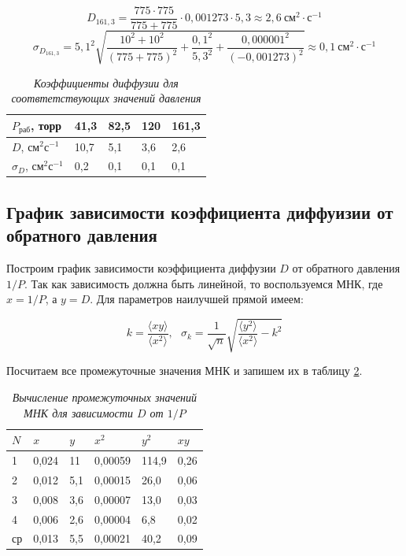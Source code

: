 \documentclass[a4paper,12pt]{article}
\begin{document}
\begin{equation*}
    D_{161,3} = \frac{775 \cdot 775}{775 + 775} \cdot 0,001273 \cdot 5,3 \approx 2,6 \ \text{см}^2 \cdot \text{с}^{-1}
\end{equation*}
\begin{equation*}
    \sigma_{D_{161,3}} = {5,1}^2 \sqrt{
    \frac{10^2 + 10^2}{\left( 775 + 775 \right)^2} + 
    \frac{{0,1}^2}{{5,3}^2} + \frac{{0,000001}^2}{({-0,001273})^2}
    } \approx 0,1 \ \text{см}^2 \cdot \text{с}^{-1}
\end{equation*}

\begin{table}[!ht]
    \centering
    \begin{tabular}{|l|l|l|l|l|}
    \hline
        $P_\text{раб}$, торр & 41,3 & 82,5 & 120 & 161,3 \\ \hline
        $D$, $\text{см}^2 \text{с}^{-1}$ & 10,7 & 5,1 & 3,6 & 2,6 \\ \hline
        $\sigma_D$, $\text{см}^2 \text{с}^{-1}$ & 0,2 & 0,1 & 0,1 & 0,1 \\ \hline
    \end{tabular}\caption{\textit{Коэффициенты диффузии для соотвтетствующих значений давления}}\label{table:diffusion}
\end{table}

\newpage
 
\subsection{График зависимости коэффициента диффуизии от обратного давления}

Построим график зависимости коэффициента диффузии $D$ от обратного давления $1/P$. Так как зависимость должна быть линейной, то воспользуемся МНК, где $x = 1/P$, а $y = D$. Для параметров наилучшей прямой имеем:

\begin{equation}\label{eq:mnk-linear}
    k = \frac{\langle x y \rangle}{\langle x^2 \rangle}, \ \ \ \sigma_k = \frac{1}{\sqrt{n}} \sqrt{\frac{\langle y^2 \rangle}{\langle x^2 \rangle} - k^2}
\end{equation}

Посчитаем все промежуточные значения МНК и запишем их в таблицу \ref{table:mnk-2}.

\begin{table}[!ht]
    \centering
    \begin{tabular}{|l|l|l|l|l|l|}
    \hline
        $N$ & $x$ & $y$ & $x^2$ & $y^2$ & $xy$ \\ \hline
        1 & 0,024 & 11 & 0,00059 & 114,9 & 0,26 \\ \hline
        2 & 0,012 & 5,1 & 0,00015 & 26,0 & 0,06 \\ \hline
        3 & 0,008 & 3,6 & 0,00007 & 13,0 & 0,03 \\ \hline
        4 & 0,006 & 2,6 & 0,00004 & 6,8 & 0,02 \\ \hline
        ср & 0,013 & 5,5 & 0,00021 & 40,2 & 0,09 \\ \hline
    \end{tabular}\caption{\textit{Вычисление промежуточных значений МНК для зависимости $D$ от $1/P$}}\label{table:mnk-2}
\end{table}
\end{document}
